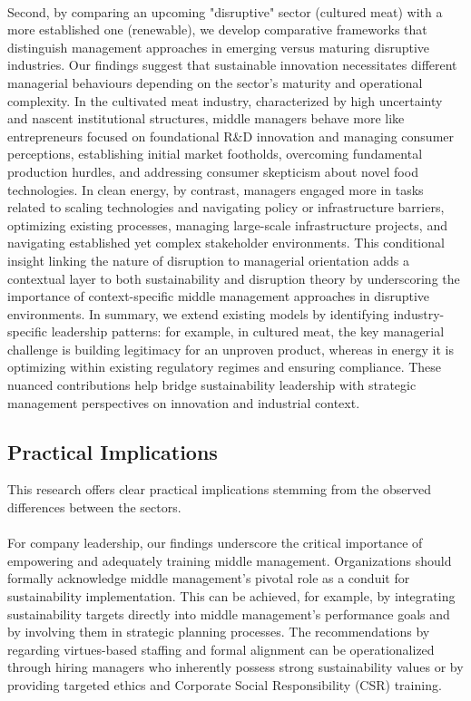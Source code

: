 	\paragraph*{} Second, by comparing an upcoming "disruptive" sector (cultured meat) with a more established one (renewable), we develop comparative frameworks that distinguish management approaches in emerging versus maturing disruptive industries. Our findings suggest that sustainable innovation necessitates different managerial behaviours depending on the sector's maturity and operational complexity. In the cultivated meat industry, characterized by high uncertainty and nascent institutional structures, middle managers behave more like entrepreneurs focused on foundational R\&D innovation and managing consumer perceptions, establishing initial market footholds, overcoming fundamental production hurdles, and addressing consumer skepticism about novel food technologies. In clean energy, by contrast, managers engaged more in tasks related to scaling technologies and navigating policy or infrastructure barriers, optimizing existing processes, managing large-scale infrastructure projects, and navigating established yet complex stakeholder environments. This conditional insight linking the nature of disruption to managerial orientation adds a contextual layer to both sustainability and disruption theory by underscoring the importance of context-specific middle management approaches in disruptive environments. In summary, we extend existing models by identifying industry-specific leadership patterns: for example, in cultured meat, the key managerial challenge is building legitimacy for an unproven product, whereas in energy it is optimizing within existing regulatory regimes and ensuring compliance. These nuanced contributions help bridge sustainability leadership with strategic management perspectives on innovation and industrial context.
	
	\subsection{Practical Implications}
	This research offers clear practical implications stemming from the observed differences between the sectors.
	
	\paragraph*{} For company leadership, our findings underscore the critical importance of empowering and adequately training middle management. Organizations should formally acknowledge middle management's pivotal role as a conduit for sustainability implementation. This can be achieved, for example, by integrating sustainability targets directly into middle management's performance goals and by involving them in strategic planning processes. The recommendations by \citeauthor{Posch2017} regarding virtues-based staffing and formal alignment can be operationalized through hiring managers who inherently possess strong sustainability values or by providing targeted ethics and Corporate Social Responsibility (CSR) training.
	

